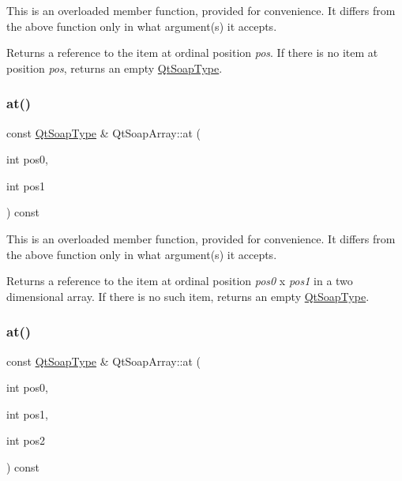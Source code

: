 This is an overloaded member function, provided for convenience. It differs from the above function only in what argument(s) it accepts.

Returns a reference to the item at ordinal position {\itshape pos}. If there is no item at position {\itshape pos}, returns an empty \mbox{\hyperlink{class_qt_soap_type}{Qt\+Soap\+Type}}. \mbox{\label{class_qt_soap_array_ac5ea1b439e350850fa97a884034815d3}} 
\subsubsection{\texorpdfstring{at()}{at()}\hspace{0.1cm}{\footnotesize\ttfamily [7/10]}}
{\footnotesize\ttfamily const \mbox{\hyperlink{class_qt_soap_type}{Qt\+Soap\+Type}} \& Qt\+Soap\+Array\+::at (\begin{DoxyParamCaption}\item[{int}]{pos0,  }\item[{int}]{pos1 }\end{DoxyParamCaption}) const}

This is an overloaded member function, provided for convenience. It differs from the above function only in what argument(s) it accepts.

Returns a reference to the item at ordinal position {\itshape pos0} x {\itshape pos1} in a two dimensional array. If there is no such item, returns an empty \mbox{\hyperlink{class_qt_soap_type}{Qt\+Soap\+Type}}. \mbox{\label{class_qt_soap_array_a28f7615e8dda6fa81f04ce2272b1186b}} 
\subsubsection{\texorpdfstring{at()}{at()}\hspace{0.1cm}{\footnotesize\ttfamily [8/10]}}
{\footnotesize\ttfamily const \mbox{\hyperlink{class_qt_soap_type}{Qt\+Soap\+Type}} \& Qt\+Soap\+Array\+::at (\begin{DoxyParamCaption}\item[{int}]{pos0,  }\item[{int}]{pos1,  }\item[{int}]{pos2 }\end{DoxyParamCaption}) const}

